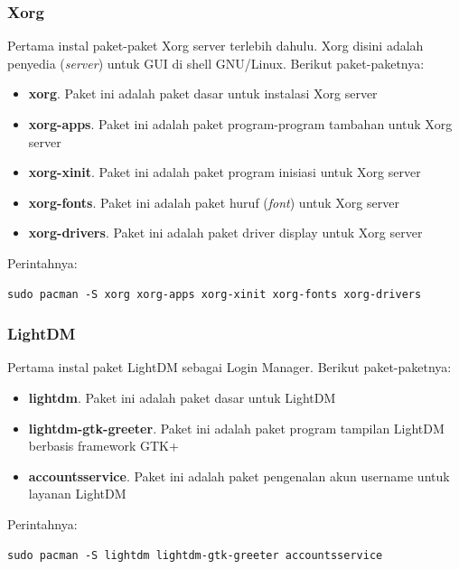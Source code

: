 \documentclass[12pt,]{article}
\begin{document}
	\subsubsection{Xorg}
	Pertama instal paket-paket Xorg server terlebih dahulu.
	Xorg disini adalah penyedia (\textit{server}) untuk GUI di shell GNU/Linux.
	Berikut paket-paketnya:
	\begin{itemize}
		\item \textbf{xorg}. Paket ini adalah paket dasar untuk instalasi Xorg server
		\item \textbf{xorg-apps}. Paket ini adalah paket program-program tambahan untuk Xorg server
		\item \textbf{xorg-xinit}. Paket ini adalah paket program inisiasi untuk Xorg server
		\item \textbf{xorg-fonts}. Paket ini adalah paket huruf (\textit{font}) untuk Xorg server
		\item \textbf{xorg-drivers}. Paket ini adalah paket driver display untuk Xorg server
	\end{itemize}
	Perintahnya:
	\begin{verbatim}
sudo pacman -S xorg xorg-apps xorg-xinit xorg-fonts xorg-drivers
	\end{verbatim}
	
	\subsubsection{LightDM}
	Pertama instal paket LightDM sebagai Login Manager.
	Berikut paket-paketnya:
	\begin{itemize}
		\item \textbf{lightdm}. Paket ini adalah paket dasar untuk LightDM
		\item \textbf{lightdm-gtk-greeter}. Paket ini adalah paket program tampilan LightDM berbasis framework GTK+ 
		\item \textbf{accountsservice}. Paket ini adalah paket pengenalan akun username untuk layanan LightDM
	\end{itemize}
	Perintahnya:
	\begin{verbatim}
sudo pacman -S lightdm lightdm-gtk-greeter accountsservice
	\end{verbatim}
	
\end{document}

